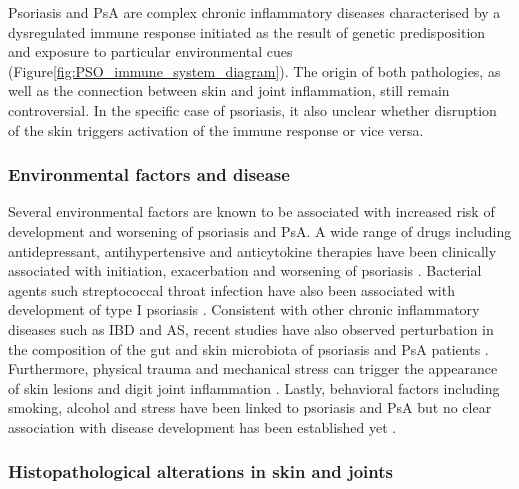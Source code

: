 Psoriasis and PsA are complex chronic inflammatory diseases characterised by a dysregulated immune response initiated as the result of genetic predisposition and exposure to particular environmental cues (Figure\ref{fig:PSO_immune_system_diagram}). The origin of both pathologies, as well as the connection between skin and joint inflammation, still remain controversial. In the specific case of psoriasis, it also unclear whether disruption of the skin triggers activation of the immune response or vice versa.


\subsubsection*{Environmental factors and disease}
Several environmental factors are known to be associated with increased risk of development and worsening of psoriasis and PsA. A wide range of drugs including antidepressant, antihypertensive and anticytokine therapies have been clinically associated with initiation, exacerbation and worsening of psoriasis \parencite{Kim2010}. Bacterial agents such streptococcal throat infection have also been associated with development of type I psoriasis \parencite{Gudjonsson2003,Valdimarsson2009, Diluvio2006}. Consistent with other chronic inflammatory diseases such as IBD and AS, recent studies have also observed perturbation in the composition of the gut and skin microbiota of psoriasis and PsA patients \parencite{add reference}. Furthermore, physical trauma and mechanical stress can trigger the appearance of skin lesions and digit joint inflammation \parencite {Weiss2002,Nestle2009}. Lastly, behavioral factors including smoking, alcohol and stress have been linked to psoriasis and PsA but no clear association with disease development has been established yet \parencite{Meglio2014}.


\subsubsection*{Histopathological alterations in skin and joints}


